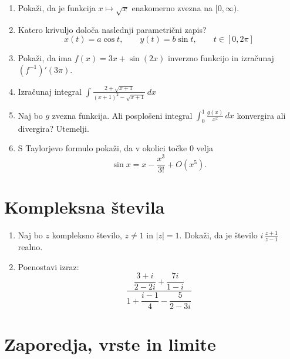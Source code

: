 \documentclass[a4paper,12pt]{article}
\begin{document}
\begin{enumerate}
\item
Pokaži, da je funkcija \(x \mapsto \sqrt{x}\) enakomerno zvezna na
\([0, \infty)\).

\item
Katero krivuljo določa naslednji parametrični zapis?
\[
x(t) = a \cos t, \qquad
y(t) = b \sin t, \qquad
t \in [0, 2 \pi]
\]

\item
Pokaži, da ima \(f(x) = 3x + \sin(2x)\) inverzno funkcijo in izračunaj
\((f^{-1})'(3\pi)\).

\item
Izračunaj integral
\(\displaystyle \int \frac{2+\sqrt{x+1}}{(x+1)^2-\sqrt{x+1}}\,dx\)

\item
Naj bo \(g\) zvezna funkcija. Ali posplošeni integral
\(\displaystyle \int_0^1 \frac{g(x)}{x^2}\,dx\)
konvergira ali divergira? Utemelji.

\item
S Taylorjevo formulo pokaži, da v okolici točke \(0\) velja
\[
\sin x = x - \frac{x^3}{3!} + O(x^5).
\]
\end{enumerate}

\section*{Kompleksna števila}

\begin{enumerate}
\item
Naj bo \(z\) kompleksno število, \(z \ne 1\) in \(|z| = 1\).
Dokaži, da je število \( i \, \frac{z+1}{z-1} \) realno.

\item
Poenostavi izraz:
\[
\frac{\dfrac{3+i}{2-2i} + \dfrac{7i}{1-i}}
     {1 + \dfrac{i-1}{4} - \dfrac{5}{2-3i}}
\]
\end{enumerate}

\section*{Zaporedja, vrste in limite}
\end{document}
